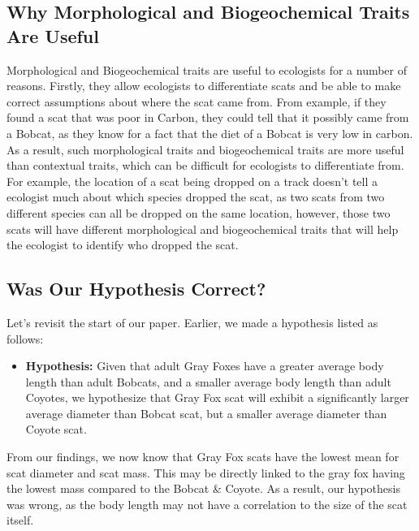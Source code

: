 \documentclass[a4paper]{article}
\begin{document}
\subsection{Why Morphological and Biogeochemical Traits Are Useful}
Morphological and Biogeochemical traits are useful to ecologists for a number of reasons. Firstly, they allow ecologists to differentiate scats and be able to 
make correct assumptions about where the scat came from. From example, if they found a scat that was poor in Carbon, they could tell that it possibly came
from a Bobcat, as they know for a fact that the diet of a Bobcat is very low in carbon. As a result, such morphological traits and biogeochemical traits are
more useful than contextual traits, which can be difficult for ecologists to differentiate from. For example, the location of a scat being dropped on a 
track doesn't tell a ecologist much about which species dropped the scat, as two scats from two different species can all be dropped on the same location, 
however, those two scats will have different morphological and biogeochemical traits that will help the ecologist to identify who dropped the scat.

\subsection{Was Our Hypothesis Correct?}
Let's revisit the start of our paper. Earlier, we made a hypothesis listed as follows:
\begin{itemize}
    \item \textbf{Hypothesis: } Given that adult Gray Foxes have a greater average body length than adult Bobcats, and a smaller average body length than 
    adult Coyotes, we hypothesize that Gray Fox scat will exhibit a significantly larger average diameter than Bobcat scat, but a smaller average diameter 
    than Coyote scat.
\end{itemize} 

\noindent From our findings, we now know that Gray Fox scats have the lowest mean for scat diameter and scat mass. This may be directly linked to the gray fox having
the lowest mass compared to the Bobcat \& Coyote. As a result, our hypothesis was wrong, as the body length may not have a correlation to the size of the
scat itself.


\newpage
\end{document}
